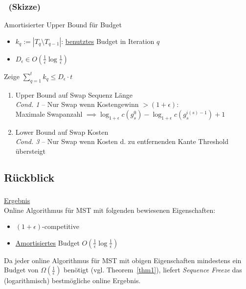 \begin{frame}
    \frametitle{\insertsubsection~(Skizze)}
    Amortisierter Upper Bound für Budget
    \vspace{.5em}
    \begin{itemize}
        \itemsep\setlength{.5em}
        \item $k_q := |T_q \setminus T_{q-1}|$: \underline{benutztes} Budget in Iteration $q$
        \item $D_\epsilon \in O(\frac{1}{\epsilon}\log\frac{1}{\epsilon})$
    \end{itemize}
    \vspace{.5em}
    \begin{block}{Zeige $\sum_{q=1}^t k_q \leq D_\epsilon \cdot t$}
        \vspace{.5em}
        \begin{enumerate}
            \itemsep\setlength{.8em}
            \item Upper Bound auf Swap Sequenz Länge\\
            \emph{Cond. 1} -- Nur Swap wenn Kostengewinn $> (1+\epsilon)$:\\Maximale Swapanzahl $\implies \log_{1+\epsilon}c(g_s^0) - \log_{1+\epsilon}c(g_s^{i(s)-1}) + 1$
            \item Lower Bound auf Swap Kosten\\
            \emph{Cond. 3} -- Nur Swap wenn Kosten d. zu entfernenden Kante Threshold übersteigt
        \end{enumerate}
        \vspace{.1em}
    \end{block}
\end{frame}

\subsection{Rückblick}
\begin{frame}
    \frametitle{\insertsection}
    \underline{Ergebnis}\\
    \vspace{1em}
    Online Algorithmus für MST mit folgenden bewiesenen Eigenschaften:\\
    \vspace{1em}
    \begin{itemize}
        \itemsep\setlength{.8em}
        \item $(1+\epsilon)$-competitive
        \item \underline{Amortisiertes} Budget $O(\frac{1}{\epsilon}\log\frac{1}{\epsilon})$
    \end{itemize}
    \vspace{1em}
    Da jeder online Algorithmus für MST mit obigen Eigenschaften mindestens ein Budget von $\Omega(\frac{1}{\epsilon})$ benötigt (vgl. Theorem~\ref{thm1}), liefert \emph{Sequence Freeze} das (logarithmisch) bestmögliche online Ergebnis.
\end{frame}